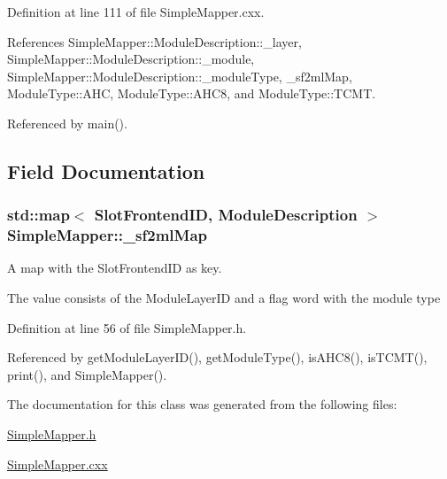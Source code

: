 Definition at line 111 of file Simple\-Mapper.\-cxx.



References Simple\-Mapper\-::\-Module\-Description\-::\-\_\-layer, Simple\-Mapper\-::\-Module\-Description\-::\-\_\-module, Simple\-Mapper\-::\-Module\-Description\-::\-\_\-module\-Type, \-\_\-sf2ml\-Map, Module\-Type\-::\-A\-H\-C, Module\-Type\-::\-A\-H\-C8, and Module\-Type\-::\-T\-C\-M\-T.



Referenced by main().



\subsection{Field Documentation}
\hypertarget{class_simple_mapper_abc72184f9c3735233e2d21ef36161699}{
\subsubsection[{\-\_\-sf2ml\-Map}]{\setlength{\rightskip}{0pt plus 5cm}std\-::map$<$ {\bf Slot\-Frontend\-I\-D}, {\bf Module\-Description} $>$ Simple\-Mapper\-::\-\_\-sf2ml\-Map}}\label{class_simple_mapper_abc72184f9c3735233e2d21ef36161699}


A map with the Slot\-Frontend\-I\-D as key. 

The value consists of the Module\-Layer\-I\-D and a flag word with the module type 

Definition at line 56 of file Simple\-Mapper.\-h.



Referenced by get\-Module\-Layer\-I\-D(), get\-Module\-Type(), is\-A\-H\-C8(), is\-T\-C\-M\-T(), print(), and Simple\-Mapper().



The documentation for this class was generated from the following files\-:\begin{DoxyCompactItemize}
\item 
\hyperlink{_simple_mapper_8h}{Simple\-Mapper.\-h}\item 
\hyperlink{_simple_mapper_8cxx}{Simple\-Mapper.\-cxx}\end{DoxyCompactItemize}
